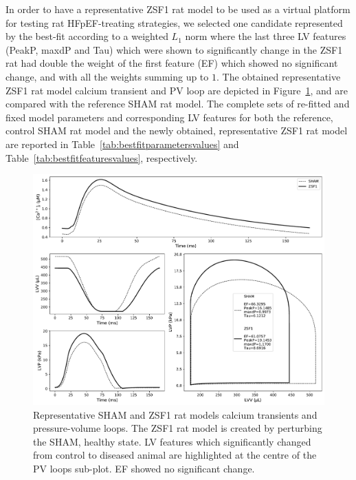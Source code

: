 \vspace{0.2cm}
In order to have a representative ZSF1 rat model to be used as a virtual platform for testing rat HFpEF-treating strategies, we selected one candidate represented by the best-fit according to a weighted $L_1$ norm where the last three LV features (PeakP, maxdP and Tau) which were shown to significantly change in the ZSF1 rat had double the weight of the first feature (EF) which showed no significant change, and with all the weights summing up to $1$. The obtained representative ZSF1 rat model calcium transient and PV loop are depicted in Figure~\ref{fig:shamandzsf1ratmodels}, and are compared with the reference SHAM rat model. The complete sets of re-fitted and fixed model parameters and corresponding LV features for both the reference, control SHAM rat model and the newly obtained, representative ZSF1 rat model are reported in Table~\ref{tab:bestfitparametersvalues} and Table~\ref{tab:bestfitfeaturesvalues}, respectively.

\begin{figure}[!ht]
    \myfloatalign
    \includegraphics[width=\textwidth]{figures/chapter07/w1_resulting_bestfit_ca_and_pvloop.pdf}
    \caption{Representative SHAM and ZSF1 rat models calcium transients and pressure-volume loops. The ZSF1 rat model is created by perturbing the SHAM, healthy state. LV features which significantly changed from control to diseased animal are highlighted at the centre of the PV loops sub-plot. EF showed no significant change.}
    \label{fig:shamandzsf1ratmodels}
\end{figure}

